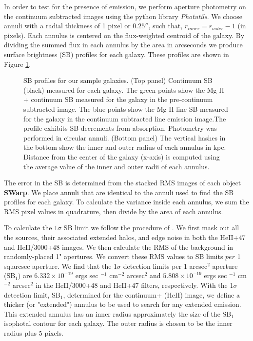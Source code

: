 \documentclass[twocolumn]{aastex61}
\begin{document}
In order to test for the presence of  emission, we perform aperture photometry on the continuum subtracted images using the python library \emph{Photutils}. We choose annuli with a radial thickness of 1 pixel or $0.25 ''$, such that, $r_{inner}=r_{outer}-1$ (in pixels). Each annulus is centered on the flux-weighted centroid of the galaxy. By dividing the summed flux in each annulus by the area in arcseconds we produce surface brightness (SB) profiles for each galaxy. These profiles are shown in Figure \ref{fig:sb_profiles}. 

\begin{figure}
\centering
{}
\caption{SB profiles for our sample galaxies. (Top panel) Continuum SB (black) measured for each galaxy. The green points show the Mg II + continuum SB measured for the galaxy in the pre-continuum subtracted image. The blue points show the Mg II line SB measured for the galaxy in the continuum subtracted line emission image.The profile exhibits SB decrements from  absorption. Photometry was performed in circular annuli. (Bottom panel) The vertical hashes in the bottom show the inner and outer radius of each annulus in kpc. Distance from the center of the galaxy (x-axis) is computed using the average value of the inner and outer radii of each annulus.}
\label{fig:sb_profiles}
\end{figure}

The error in the SB is determined from the stacked RMS images of each object \textbf{SWarp}. We place annuli that are identical to the annuli used to find the SB profiles for each galaxy. To calculate the variance inside each annulus, we sum the RMS pixel values in quadrature, then divide by the area of each annulus. 

To calculate the $1\sigma$ SB limit we follow the procedure of \cite{Battaia_2015}. We first mask out all the sources, their associated extended halos, and edge noise in both the HeII+47 and HeII/3000+48 images. We then calculate the RMS of the background in randomly-placed 1" apertures. We convert these RMS values to SB limits $per$ 1 sq.arcsec aperture. We find that the 1$\sigma$ detection limits per 1 arcsec$^2$ aperture (SB$_1$) are $6.332\times10^{-19}$ ergs sec $^{-1}$ cm$^{-2}$ arcsec$^2$ and $5.808\times10^{-19} $ ergs sec $^{-1}$ cm$^{-2}$ arcsec$^2$ in the HeII/3000+48 and HeII+47 filters, respectively. With the 1$\sigma$ detection limit, SB$_1$, determined for the continuum+ (HeII) image, we define a thicker (or "extended") annulus to be used to search for any extended  emission. This extended annulus has an inner radius approximately the size of the SB$_1$ isophotal contour for each galaxy. The outer radius is chosen to be the inner radius plus 5 pixels.
\end{document}
